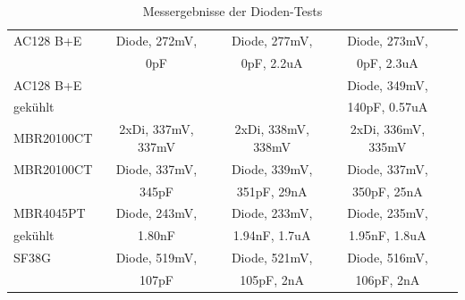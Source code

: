 \begin{table}[H]
\begin{center}
\begin{tabular}{| l | c | c | c | c |}
    \hline
AC128 B+E  & Diode, 272mV,        & Diode, 277mV,              & Diode, 273mV,             \\
           &               0pF    &               0pF, 2.2uA   &               0pF, 2.3uA  \\
    \hline
AC128 B+E  &                      &                     & Diode, 349mV,               \\
gekühlt    &                      &                     &               140pF, 0.57uA \\
    \hline
MBR20100CT & 2xDi, 337mV, 337mV   & 2xDi, 338mV, 338mV  & 2xDi, 336mV, 335mV  \\
    \hline
MBR20100CT & Diode, 337mV,        & Diode, 339mV,             & Diode, 337mV,            \\
           &               345pF  &               351pF, 29nA &               350pF, 25nA\\
    \hline
MBR4045PT  & Diode, 243mV,        & Diode, 233mV,               & Diode, 235mV,              \\
gekühlt    &               1.80nF &               1.94nF, 1.7uA &               1.95nF, 1.8uA\\
    \hline
SF38G      & Diode, 519mV,        & Diode, 521mV,            & Diode, 516mV,            \\
           &               107pF  &               105pF, 2nA &               106pF, 2nA \\
    \hline
    \end{tabular}
  \end{center}
  \caption{Messergebnisse der Dioden-Tests}
  \label{tab:diodes} 
\end{table}

